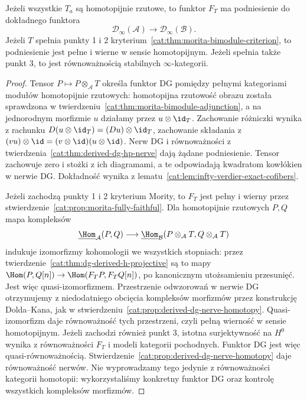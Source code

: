 \begin{twierdzenie}\label{cat:thm:morita-infty-lift}
Jeżeli wszystkie $T_a$ są homotopijnie rzutowe, to funktor $F_T$ ma podniesienie do dokładnego funktora
\[
 \mathcal D_\infty(\mathcal A)\longrightarrow\mathcal D_\infty(\mathcal B).
\]
Jeżeli $T$ spełnia punkty 1 i 2 kryterium~\ref{cat:thm:morita-bimodule-criterion}, to podniesienie jest pełne i wierne w sensie homotopijnym. Jeżeli spełnia także punkt 3, to jest równoważnością stabilnych $\infty$-kategorii.
\end{twierdzenie}
\begin{proof}
Tensor $P\mapsto P\otimes_{\mathcal A}T$ określa funktor DG pomiędzy pełnymi kategoriami modułów homotopijnie rzutowych: homotopijna rzutowość obrazu została sprawdzona w twierdzeniu~\ref{cat:thm:morita-bimodule-adjunction}, a na jednorodnym morfizmie $u$ działamy przez $u\otimes\id_T$. Zachowanie różniczki wynika z rachunku $D(u\otimes\id_T)=(Du)\otimes\id_T$, zachowanie składania z $(vu)\otimes\id=(v\otimes\id)(u\otimes\id)$. Nerw DG i równoważności z twierdzenia~\ref{cat:thm:derived-dg-hp-nerve} dają żądane podniesienie. Tensor zachowuje zero i stożki z ich diagramami, a te odpowiadają kwadratom kowłókien w nerwie DG. Dokładność wynika z lematu~\ref{cat:lem:infty-verdier-exact-cofibers}.

Jeżeli zachodzą punkty 1 i 2 kryterium Mority, to $F_T$ jest pełny i wierny przez stwierdzenie~\ref{cat:prop:morita-fully-faithful}. Dla homotopijnie rzutowych $P,Q$ mapa kompleksów
\[
 \underline{\Hom}_{\mathcal A}(P,Q)
 \longrightarrow
 \underline{\Hom}_{\mathcal B}(P\otimes_{\mathcal A}T,Q\otimes_{\mathcal A}T)
\]
indukuje izomorfizmy kohomologii we wszystkich stopniach: przez twierdzenie~\ref{cat:thm:dg-derived-h-projective} są to mapy $\Hom(P,Q[n])\to\Hom(F_TP,F_TQ[n])$, po kanonicznym utożsamieniu przesunięć. Jest więc quasi-izomorfizmem. Przestrzenie odwzorowań w nerwie DG otrzymujemy z niedodatniego obcięcia kompleksów morfizmów przez konstrukcję Dolda--Kana, jak w stwierdzeniu~\ref{cat:prop:derived-dg-nerve-homotopy}. Quasi-izomorfizm daje równoważność tych przestrzeni, czyli pełną wierność w sensie homotopijnym. Jeżeli zachodzi również punkt 3, istotna surjektywność na $H^0$ wynika z równoważności $F_T$ i modeli kategorii pochodnych. Funktor DG jest więc quasi-równoważnością. Stwierdzenie~\ref{cat:prop:derived-dg-nerve-homotopy} daje równoważność nerwów. Nie wyprowadzamy tego jedynie z równoważności kategorii homotopii: wykorzystaliśmy konkretny funktor DG oraz kontrolę wszystkich kompleksów morfizmów.
\end{proof}

